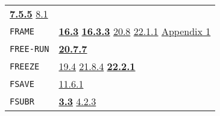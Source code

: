\documentclass[a4paper]{scrbook}
\begin{document}
\begin{longtable}[]{@{}ll@{}}
\begin{minipage}[t]{0.70\columnwidth}
\textbf{\href{07-structured-objects.md\#755-form-and-iform}{7.5.5}} \href{08-truth.md\#81-truth-values-1}{8.1}\strut
\end{minipage}\tabularnewline
\begin{minipage}[t]{0.24\columnwidth}\raggedright\strut
\texttt{FRAME}\strut
\end{minipage} & \begin{minipage}[t]{0.70\columnwidth}\raggedright\strut
\textbf{\href{16-errors-frames-etc.md\#163-frame-the-type}{16.3}}
\textbf{\href{16-errors-frames-etc.md\#1633-frame-the-subr}{16.3.3}}
\href{20-coroutines.md\#208-sneakiness-with-processes}{20.8}
\href{22-storage-management.md\#2211-stacks-and-other-internal-vectors}{22.1.1}
\href{appendix-1-a-look-inside.md\#appendix-1-a-look-inside}{Appendix 1}\strut
\end{minipage}\tabularnewline
\begin{minipage}[t]{0.24\columnwidth}\raggedright\strut
\texttt{FREE-RUN}\strut
\end{minipage} & \begin{minipage}[t]{0.70\columnwidth}\raggedright\strut
\textbf{\href{20-coroutines.md\#2077-free-run}{20.7.7}}\strut
\end{minipage}\tabularnewline
\begin{minipage}[t]{0.24\columnwidth}\raggedright\strut
\texttt{FREEZE}\strut
\end{minipage} & \begin{minipage}[t]{0.70\columnwidth}\raggedright\strut
\href{19-compiled-programs.md\#194-pure-and-impure-code}{19.4} \href{21-interrupts.md\#2184-gc}{21.8.4}
\textbf{\href{22-storage-management.md\#2221-garbage-collected-freeze}{22.2.1}}\strut
\end{minipage}\tabularnewline
\begin{minipage}[t]{0.24\columnwidth}\raggedright\strut
\texttt{FSAVE}\strut
\end{minipage} & \begin{minipage}[t]{0.70\columnwidth}\raggedright\strut
\href{11-input-output.md\#1161-save}{11.6.1}\strut
\end{minipage}\tabularnewline
\begin{minipage}[t]{0.24\columnwidth}\raggedright\strut
\texttt{FSUBR}\strut
\end{minipage} & \begin{minipage}[t]{0.70\columnwidth}\raggedright\strut
\textbf{\href{03-built-in-functions.md\#33-built-in-functions-type-subr-type-fsubr-1}{3.3}}
\href{04-values-of-atoms.md\#423-note-on-subrs-and-fsubrs}{4.2.3}

\end{minipage}
\end{longtable}
\end{document}
